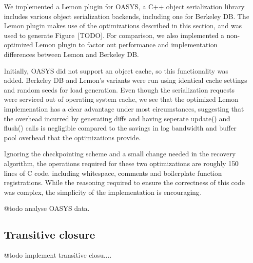 \documentclass[letterpaper,twocolumn,english]{article}
\newcommand{\yad}{Lemon\xspace}
\begin{document}
We implemented a \yad plugin for OASYS, a C++ object serialization
library includes various object serialization backends, including one
for Berkeley DB.  The \yad plugin makes use of the optimizations
described in this section, and was used to generate Figure~[TODO].
For comparison, we also implemented a non-optimized \yad plugin to
factor out performance and implementation differences between \yad
and Berkeley DB.

Initially, OASYS did not support an object cache, so this
functionality was added.  Berkeley DB and \yad's variants were run
using identical cache settings and random seeds for load generation.
Even though the serialization requests were serviced out of operating
system cache, we see that the optimized \yad implemenation has a
clear advantage under most circumstances, suggesting that the overhead
incurred by generating diffs and having seperate update() and flush()
calls is negligible compared to the savings in log bandwidth and
buffer pool overhead that the optimizations provide.

Ignoring the checkpointing scheme and a small change needed in the
recovery algorithm, the operations required for these two
optimizations are roughly 150 lines of C code, including whitespace,
comments and boilerplate function registrations.  While the reasoning
required to ensure the correctness of this code was complex, the
simplicity of the implementation is encouraging.

@todo analyse OASYS data.

\subsection{Transitive closure}

@todo implement transitive closu....
\end{document}

